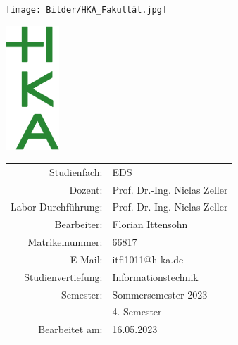 	\sffamily %
	\parbox[t]{0.35\textwidth}
	{\vspace{0pt}\texttt{[image: Bilder/HKA\_Fakultät.jpg]}}
	\hfill
	\parbox[t]{0.15\textwidth}
	{\vspace{0pt}\includegraphics[width=0.15\textwidth]{Bilder/HKA_Logo.jpg}}
	\vfill
	\parbox{\textwidth}
	{}
	\vfill
	\parbox{\textwidth}
	{\begin{flushright}{\large
			\begin{tabular}{rl}
				Studienfach:& EDS\\
				Dozent:& Prof. Dr.-Ing. Niclas Zeller\\
				Labor Durchführung:& Prof. Dr.-Ing. Niclas Zeller\\
				Bearbeiter:& Florian Ittensohn\\
				Matrikelnummer:& 66817\\
				E-Mail:& itfl1011@h-ka.de\\
				Studienvertiefung:& Informationstechnik\\
				Semester:& Sommersemester 2023\\
				&4. Semester \\
				Bearbeitet am:& 16.05.2023
			\end{tabular}}
	\end{flushright}}
	\rmfamily %
	\normalsize %